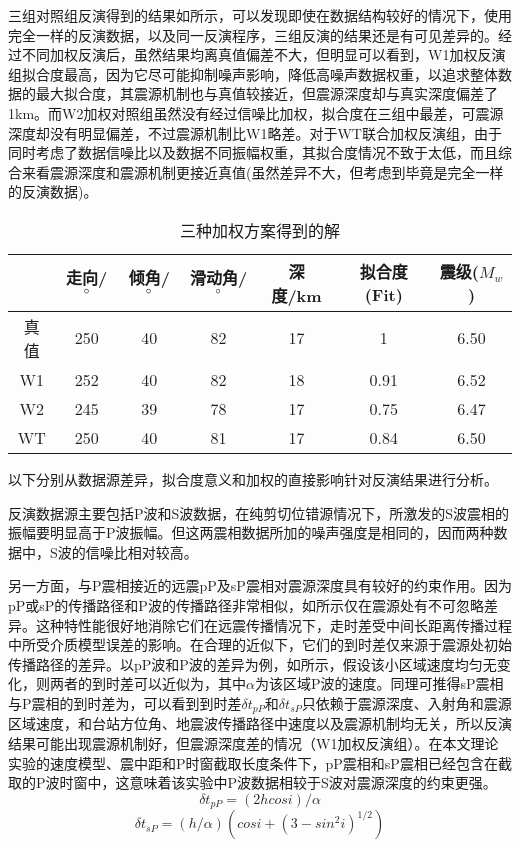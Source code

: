三组对照组反演得到的结果如所示，可以发现即使在数据结构较好的情况下，使用完全一样的反演数据，以及同一反演程序，三组反演的结果还是有可见差异的。经过不同加权反演后，虽然结果均离真值偏差不大，但明显可以看到，W1加权反演组拟合度最高，因为它尽可能抑制噪声影响，降低高噪声数据权重，以追求整体数据的最大拟合度，其震源机制也与真值较接近，但震源深度却与真实深度偏差了1km。而W2加权对照组虽然没有经过信噪比加权，拟合度在三组中最差，可震源深度却没有明显偏差，不过震源机制比W1略差。对于WT联合加权反演组，由于同时考虑了数据信噪比以及数据不同振幅权重，其拟合度情况不致于太低，而且综合来看震源深度和震源机制更接近真值(虽然差异不大，但考虑到毕竟是完全一样的反演数据)。
\begin{table}[ht]
\centering
\caption{三种加权方案得到的解}
\label{tab3_01}
    \begin{tabular}{c c c c c c c}
    \hline
     & 走向/$^\circ$ & 倾角/$^\circ$ & 滑动角/$^\circ$ & 深度/km & 拟合度(Fit) & 震级($M_w$)\\
    \hline
    真值	& 250 & 40 & 82 & 17 & 1	& 6.50\\
    W1		& 252 & 40 & 82 & 18 & 0.91 & 6.52\\
    W2		& 245 & 39 & 78 & 17 & 0.75 & 6.47\\
    WT		& 250 & 40 & 81 & 17 & 0.84 & 6.50\\
    \hline
    \end{tabular}
\end{table}

以下分别从数据源差异，拟合度意义和加权的直接影响针对反演结果进行分析。

反演数据源主要包括P波和S波数据，在纯剪切位错源情况下，所激发的S波震相的振幅要明显高于P波振幅。但这两震相数据所加的噪声强度是相同的，因而两种数据中，S波的信噪比相对较高。

另一方面，与P震相接近的远震pP及sP震相对震源深度具有较好的约束作用。因为pP或sP的传播路径和P波的传播路径非常相似，如所示仅在震源处有不可忽略差异。这种特性能很好地消除它们在远震传播情况下，走时差受中间长距离传播过程中所受介质模型误差的影响。在合理的近似下，它们的到时差仅来源于震源处初始传播路径的差异\citep{Stein2003}。以pP波和P波的差异为例，如所示，假设该小区域速度均匀无变化，则两者的到时差可以近似为，其中$\alpha$为该区域P波的速度。同理可推得sP震相与P震相的到时差为，可以看到到时差${\delta}t_{pP}$和${\delta}t_{sP}$只依赖于震源深度、入射角和震源区域速度，和台站方位角、地震波传播路径中速度以及震源机制均无关，所以反演结果可能出现震源机制好，但震源深度差的情况（W1加权反演组）。在本文理论实验的速度模型、震中距和P时窗截取长度条件下，pP震相和sP震相已经包含在截取的P波时窗中，这意味着该实验中P波数据相较于S波对震源深度的约束更强。 
\begin{equation}
\label{eq3_01}
{\delta}t_{pP}=(2hcosi)/\alpha
\end{equation}
\begin{equation}
\label{eq3_02}
{\delta}t_{sP}=(h/\alpha)(cosi+(3-sin^2i)^{1/2})
\end{equation}

